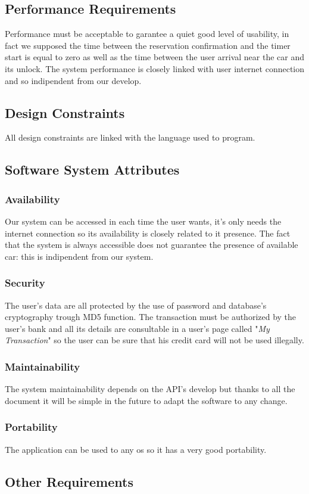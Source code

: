 \subsection{Performance Requirements} \label{sec:perf_requirements}
Performance must be acceptable to garantee a quiet good level of usability, in fact we supposed the time between the reservation confirmation and the timer start is equal to zero as well as the time between the user arrival near the car and its unlock. The system performance is closely linked with user internet connection and so indipendent from our develop.

\subsection{Design Constraints} \label{sec:design_constr}
All design constraints are linked with the language used to program.

\subsection{Software System Attributes} \label{sec:sw_sys_attr}
\subsubsection{Availability} \label{availability}
Our system can be accessed in each time the user wants, it's only needs the internet connection so its availability is closely related to it presence. The fact that the system is always accessible does not guarantee the presence of available car: this is indipendent from our system.

\subsubsection{Security} \label{security}
The user's data are all protected by the use of password and database's cryptography trough MD5 function. The transaction must be authorized by the user's bank and all its details are consultable in a user's page called "\textit{My Transaction}" so the user can be sure that his credit card will not be used illegally.

\subsubsection{Maintainability} \label{maintainability}
The system maintainability depends on the API's develop but thanks to all the document it will be simple in the future to adapt the software to any change.

\subsubsection{Portability} \label{portability}
The application can be used to any \acs{os} so it has a very good portability.

\subsection{Other Requirements} \label{other}

